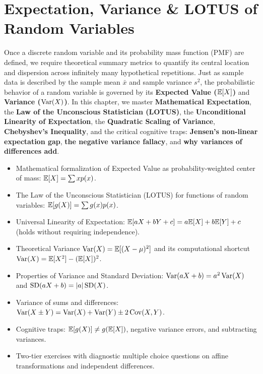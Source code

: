 \chapter{Expectation, Variance \& LOTUS of Random Variables}

Once a discrete random variable and its probability mass function (PMF) are defined, we require theoretical summary metrics to quantify its central location and dispersion across infinitely many hypothetical repetitions. Just as sample data is described by the sample mean $\bar{x}$ and sample variance $s^2$, the probabilistic behavior of a random variable is governed by its \textbf{Expected Value ($\mathbb{E}[X]$)} and \textbf{Variance ($\operatorname{Var}(X)$)}. In this chapter, we master \textbf{Mathematical Expectation}, the \textbf{Law of the Unconscious Statistician (LOTUS)}, the \textbf{Unconditional Linearity of Expectation}, the \textbf{Quadratic Scaling of Variance}, \textbf{Chebyshev's Inequality}, and the critical cognitive traps: \textbf{Jensen's non-linear expectation gap}, \textbf{the negative variance fallacy}, and \textbf{why variances of differences add}.

\vspace{0.5cm}
\begin{tcolorbox}[colback=primarylight, colframe=primarydark, title={\textbf{What You'll Learn in this Chapter}}]
\begin{itemize}
    \item Mathematical formalization of Expected Value as probability-weighted center of mass: $\mathbb{E}[X] = \sum x p(x)$.
    \item The Law of the Unconscious Statistician (LOTUS) for functions of random variables: $\mathbb{E}[g(X)] = \sum g(x) p(x)$.
    \item Universal Linearity of Expectation: $\mathbb{E}[aX + bY + c] = a\mathbb{E}[X] + b\mathbb{E}[Y] + c$ (holds without requiring independence).
    \item Theoretical Variance $\operatorname{Var}(X) = \mathbb{E}[(X - \mu)^2]$ and its computational shortcut $\operatorname{Var}(X) = \mathbb{E}[X^2] - (\mathbb{E}[X])^2$.
    \item Properties of Variance and Standard Deviation: $\operatorname{Var}(aX + b) = a^2\operatorname{Var}(X)$ and $\operatorname{SD}(aX + b) = |a|\operatorname{SD}(X)$.
    \item Variance of sums and differences: $\operatorname{Var}(X \pm Y) = \operatorname{Var}(X) + \operatorname{Var}(Y) \pm 2\operatorname{Cov}(X, Y)$.
    \item Cognitive traps: $\mathbb{E}[g(X)] \neq g(\mathbb{E}[X])$, negative variance errors, and subtracting variances.
    \item Two-tier exercises with diagnostic multiple choice questions on affine transformations and independent differences.
\end{itemize}
\end{tcolorbox}

